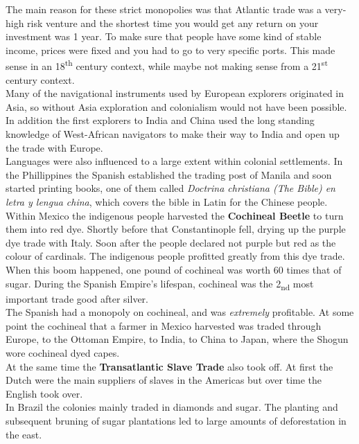 \documentclass{article}
\begin{document}
	The main reason for these strict monopolies was that Atlantic trade was a very-high risk venture and the shortest time you would get any return on your investment was 1 year. To make sure that people have some kind of stable income, prices were fixed and you had to go to very specific ports. This made sense in an 18\textsuperscript{th} century context, while maybe not making sense from a 21\textsuperscript{st} century context.\\

	Many of the navigational instruments used by European explorers originated in Asia, so without Asia exploration and colonialism would not have been possible. \\
	In addition the first explorers to India and China used the long standing knowledge of West-African navigators to make their way to India and open up the trade with Europe. \\
	Languages were also influenced to a large extent within colonial settlements. In the Phillippines the Spanish established the trading post of Manila and soon started printing books, one of them called \textit{Doctrina christiana (The Bible) en letra y lengua china}, which covers the bible in Latin for the Chinese people. \\
	Within Mexico the indigenous people harvested the \textbf{Cochineal Beetle} to turn them into red dye. Shortly before that Constantinople fell, drying up the purple dye trade with Italy. Soon after the people declared not purple but red as the colour of cardinals. The indigenous people profitted greatly from this dye trade. When this boom happened, one pound of cochineal was worth 60 times that of sugar. During the Spanish Empire's lifespan, cochineal was the 2\textsubscript{nd} most important trade good after silver. \\
	The Spanish had a monopoly on cochineal, and was \textit{extremely} profitable. At some point the cochineal that a farmer in Mexico harvested was traded through Europe, to the Ottoman Empire, to India, to China to Japan, where the Shogun wore cochineal dyed capes. \\
	At the same time the \textbf{Transatlantic Slave Trade} also took off. At first the Dutch were the main suppliers of slaves in the Americas but over time the English took over. \\
	In Brazil the colonies mainly traded in diamonds and sugar. The planting and subsequent bruning of sugar plantations led to large amounts of deforestation in the east. \\
\end{document}
